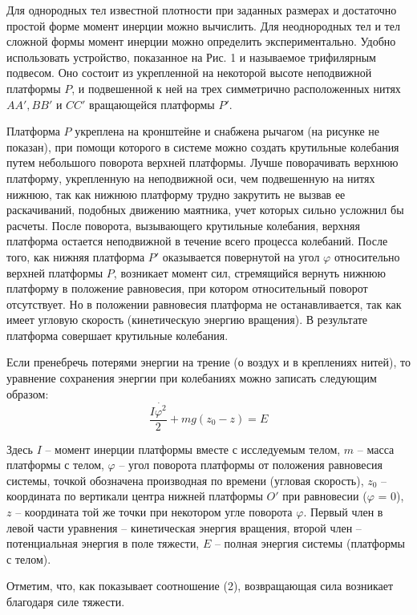 \documentclass[a4paper,12pt]{article} %
\begin{document}
Для однородных тел известной плотности при заданных размерах и достаточно простой форме момент инерции можно вычислить. Для неоднородных тел и тел сложной формы момент инерции можно определить экспериментально. Удобно использовать устройство, показанное на Рис. 1 и называемое трифилярным подвесом. Оно состоит из укрепленной на некоторой высоте неподвижной платформы $P$, и подвешенной к ней на трех симметрично расположенных нитях $AA', BB'$ и $CC'$ вращающейся платформы $P'$.

Платформа $P$ укреплена на кронштейне и снабжена рычагом (на рисунке не показан), при помощи которого в системе можно создать крутильные колебания путем небольшого поворота верхней платформы. Лучше поворачивать верхнюю платформу, укрепленную на неподвижной оси, чем подвешенную на нитях нижнюю, так как нижнюю платформу трудно закрутить не вызвав ее раскачиваний, подобных движению маятника, учет которых сильно усложнил бы расчеты. После поворота, вызывающего крутильные колебания, верхняя платформа остается неподвижной в течение всего процесса колебаний. После того, как нижняя платформа $P'$ оказывается повернутой на угол $\varphi$ относительно верхней платформы $P$, возникает момент сил, стремящийся вернуть нижнюю платформу в положение равновесия, при котором относительный поворот отсутствует. Но в положении равновесия платформа не останавливается, так как имеет угловую скорость (кинетическую энергию вращения). В результате платформа совершает крутильные колебания.

Если пренебречь потерями энергии на трение (о воздух и в креплениях нитей), то уравнение сохранения энергии при колебаниях можно записать следующим образом:
\begin{equation}
\frac{I\dot{\varphi^2}}{2} + mg(z_0-z) = E
\end{equation} 

Здесь $I$ -- момент инерции платформы вместе с исследуемым телом, $m$ -- масса платформы с телом, $\varphi$ -- угол поворота платформы от положения равновесия системы, точкой обозначена производная по времени (угловая скорость), $z_0$ -- координата по вертикали центра нижней платформы $O'$ при равновесии ($\varphi$ = 0), $z$ -- координата той же точки при некотором угле поворота $\varphi$. Первый член в левой части уравнения -- кинетическая энергия вращения, второй член -- потенциальная энергия в поле тяжести, $E$ -- полная энергия системы (платформы с телом).

Отметим, что, как показывает соотношение (2), возвращающая сила возникает благодаря силе тяжести.
\end{document}
